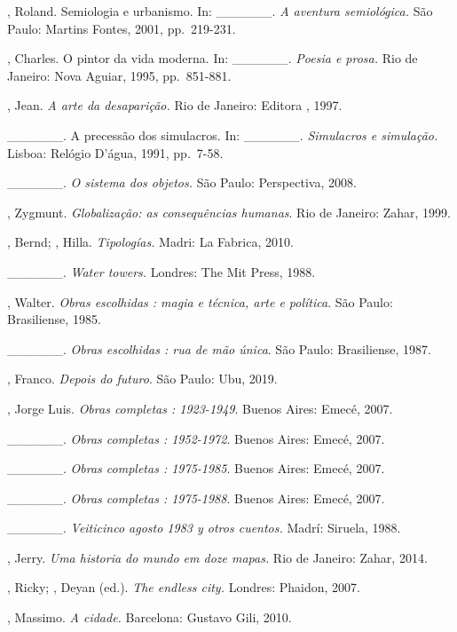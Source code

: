 \begin{Parskip}
, Roland. Semiologia e urbanismo. In: \_\_\_\_\_\_. \emph{A
aventura semiológica.} São Paulo: Martins Fontes, 2001, pp.~219-231.

, Charles. O pintor da vida moderna. In: \_\_\_\_\_\_.
\emph{Poesia e prosa.} Rio de Janeiro: Nova Aguiar, 1995, pp.~851-881.

, Jean. \emph{A arte da desaparição.} Rio de Janeiro:
Editora , 1997.

\_\_\_\_\_\_. A precessão dos simulacros. In: \_\_\_\_\_\_.
\emph{Simulacros e simulação.} Lisboa: Relógio D'água, 1991, pp.~7-58.

\_\_\_\_\_\_. \emph{O sistema dos objetos.} São Paulo:
Perspectiva, 2008.

, Zygmunt. \emph{Globalização: as consequências humanas}. Rio de
Janeiro: Zahar, 1999.

, Bernd; , Hilla. \emph{Tipologías.} Madri: La Fabrica,
2010.

\_\_\_\_\_\_. \emph{Water towers.} Londres: The Mit Press, 1988. %

, Walter. \emph{Obras escolhidas : magia e técnica, arte e
política}. São Paulo: Brasiliense, 1985.

\_\_\_\_\_\_. \emph{Obras escolhidas : rua de mão única}. São
Paulo: Brasiliense, 1987.

, Franco. \emph{Depois do futuro}. São Paulo: Ubu, 2019.

, Jorge Luis. \emph{Obras completas : 1923-1949}. Buenos Aires:
Emecé, 2007.

\_\_\_\_\_\_. \emph{Obras completas : 1952-1972}. Buenos Aires:
Emecé, 2007.

\_\_\_\_\_\_. \emph{Obras completas : 1975-1985}. Buenos Aires:
Emecé, 2007.

\_\_\_\_\_\_. \emph{Obras completas : 1975-1988}. Buenos Aires:
Emecé, 2007.

\_\_\_\_\_\_. \emph{Veiticinco agosto 1983 y otros cuentos.}
Madrí: Siruela, 1988.

, Jerry. \emph{Uma historia do mundo em doze mapas.} Rio de
Janeiro: Zahar, 2014.

, Ricky; , Deyan (ed.). \emph{The endless city.} Londres:
Phaidon, 2007.

, Massimo. \emph{A cidade.} Barcelona: Gustavo Gili, 2010.


\end{Parskip}
